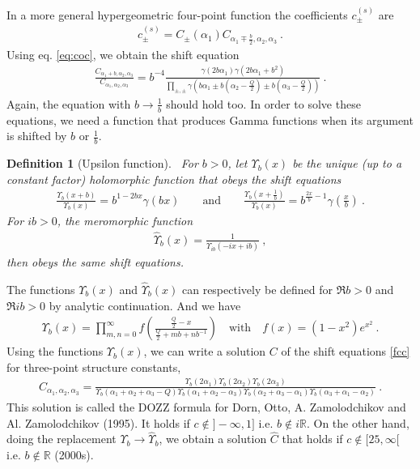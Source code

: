 \documentclass[12pt, a4paper]{article}
\theoremstyle{break}
\newtheorem{defn}[exo]{Definition}
\begin{document}
In a more general hypergeometric four-point function the coefficients $c^{(s)}_\pm$ are 
\begin{align}
 c_{\pm}^{(s)} = C_\pm(\alpha_1) C_{\alpha_1\mp\frac{b}{2},\alpha_2,\alpha_3} \ .
\label{cs}
\end{align}
Using eq. \eqref{eq:coc}, we obtain the shift equation
\begin{align}
 \frac{C_{\alpha_1+b,\alpha_2,\alpha_3}}{C_{\alpha_1,\alpha_2,\alpha_3}} = b^{-4}\frac{\gamma(2b\alpha_1)\gamma(2b\alpha_1+b^2)}{\prod_{\pm,\pm} \gamma\left(b\alpha_1\pm b(\alpha_2-\frac{Q}{2})\pm b(\alpha_3-\frac{Q}{2})\right)}\ .
\label{fcc}
\end{align}
Again, the equation with $b\to \frac{1}{b}$ should hold too. In order to solve these equations, we need a function that produces Gamma functions when its argument is shifted by $b$ or $\frac{1}{b}$. 

\begin{defn}[Upsilon function]
~\label{def:upsilon}
 For $b>0$, let $\Upsilon_b(x)$ be the unique (up to a constant factor) holomorphic function that obeys the shift equations
 \begin{align}
  \frac{\Upsilon_b(x+b)}{\Upsilon_b(x)} = b^{1-2bx} \gamma(bx)\qquad \text{and} \qquad \frac{\Upsilon_b(x+\frac{1}{b})}{\Upsilon_b(x)} = b^{\frac{2x}{b}-1} \gamma(\tfrac{x}{b})\ .
\label{upup}
\end{align}
For $ib>0$, the meromorphic function 
\begin{align}
 \hat{\Upsilon}_b(x) = \frac{1}{\Upsilon_{ib}(-ix+ib)}\ ,
\end{align}
then obeys the same shift equations.
\end{defn}
The functions $\Upsilon_b(x)$ and $\hat\Upsilon_b(x)$ can respectively be defined for $\Re b>0$ and $\Re ib>0$ by analytic continuation. And we have 
\begin{align}
 \Upsilon_b(x) = \prod_{m,n=0}^\infty f\left(\frac{\frac{Q}{2}-x}{\frac{Q}{2}+mb+nb^{-1}}\right) \quad \text{with} \quad f(x)=(1-x^2)e^{x^2}\ .
\end{align}
Using the functions $\Upsilon_b(x)$, we can write a solution $C$ of the shift equations \eqref{fcc} for three-point structure constants,
\begin{align}
 C_{\alpha_1,\alpha_2,\alpha_3} =  \frac{ \Upsilon_b(2\alpha_1) \Upsilon_b(2\alpha_2) \Upsilon_b(2\alpha_3)}{\Upsilon_b(\alpha_1+\alpha_2+\alpha_3-Q) \Upsilon_b(\alpha_1+\alpha_2-\alpha_3)\Upsilon_b(\alpha_2+\alpha_3-\alpha_1)\Upsilon_b(\alpha_3+\alpha_1-\alpha_2)} \ .
\label{caaa}
\end{align}
This solution is called the DOZZ formula for Dorn, Otto, A.
Zamolodchikov and Al. Zamolodchikov (1995). It holds if
$c\notin ]-\infty, 1]$ i.e. $b\notin i\mathbb{R}$. 
On the other hand, doing the replacement $\Upsilon_b\to \hat\Upsilon_b$, we obtain a solution $\hat C$ that holds if  $c\notin [25,\infty[$ i.e. $b\notin \mathbb{R}$ (2000s).
\end{document}
